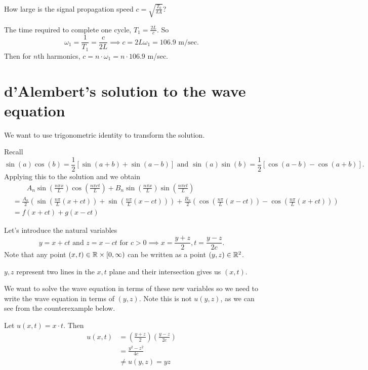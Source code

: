\documentclass[class=article,crop=false]{standalone}
\begin{document}
How large is the signal propagation speed $ c =\sqrt{\frac{T_0}{\delta A}} $?

The time required to complete one cycle, $ T_1 = \frac{2L}{c}$. So
\[
\omega_1 = \frac{1}{T_1} = \frac{c}{2L} \implies c = 2L \omega_1 = 106.9 \text{ m/sec} 
.\]
Then for $ n$th harmonics,  $c = n \cdot \omega_1 = n \cdot 106.9 $ m/sec.

\newpage
\section{d'Alembert's solution to the wave equation}

We want to use trigonometric identity to transform the solution.

Recall
\[
	\sin(a )\cos(b ) = \frac{1}{2}[\sin(a+b )+ \sin(a-b )] \text{ and } \sin(a )\sin(b ) = \frac{1}{2} [\cos(a-b) -\cos(a+b ) ] 
.\] 
Applying this to the solution and we obtain
\begin{align*}
	& \qquad A_n \sin \left( \frac{ n\pi x}{ L} \right) \cos \left( \frac{ n\pi c t}{ L} \right) + B_n \sin \left( \frac{ n\pi x}{ L} \right) \sin \left( \frac{ n\pi c t}{ L} \right) \\
	&= \frac{A_n}{2} \left( \sin\left( \frac{n\pi}{L }(x+ct) \right) + \sin\left( \frac{n\pi}{L} (x-ct) \right)  \right) + \frac{B_n}{2} \left( \cos\left( \frac{n\pi}{L }(x-ct) \right) - \cos\left( \frac{n\pi}{L }(x+ct) \right)   \right)  \\
																						  &= f(x+ct) + g(x-ct) 
\end{align*}

Let's introduce the natural variables
\[
y=x+ct \text{ and } z=x-ct \text{ for } c>0 \implies x=\frac{y+z}{2 }, t=\frac{y-z}{2c }
.\] 
Note that any point $ (x,t) \in \mathbb{R}\times [0,\infty)$ can be written as a point $ (y,z) \in \mathbb{R}^2$.
\begin{intuition}
	$ y,z$ represent two lines in the  $ x,t$ plane and their intersection gives us  $ (x,t)$.
\end{intuition}
We want to solve the wave equation in terms of these new variables so we need to write the wave equation in terms of $ (y,z)$. Note this is not $ u(y,z)$, as we can see from the counterexample below.
\begin{eg}[]
	Let $ u(x,t) = x \cdot t$. Then
	\begin{align*}
		u(x,t) &= \left( \frac{y+z}{2 } \right) \left( \frac{y-z}{2c } \right)   \\
		&= \frac{y^2 - z^2}{4c } \\
		&\neq u(y,z) = yz  \\
	\end{align*}
\end{eg}
\end{document}
